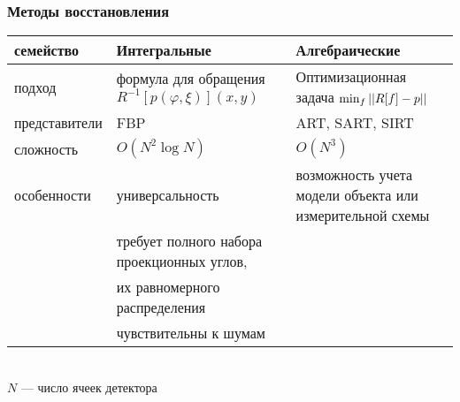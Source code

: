 \begingroup
\small
\begin{frame}
\frametitle{Методы восстановления}
\begin{tabular}{p{} | p{} | p{}}
\hspace{-1cm} семейство & Интегральные & Алгебраические \\ \hline \vspace{10pt}
\hspace{-1cm} подход & формула для обращения $R^{-1}[p(\varphi, \xi)](x,y)$ & Оптимизационная задача $\min_{f} \left|\left| R[f] - p \right|\right|$\\ \hline \vspace{10pt}
\hspace{-1cm} представители & FBP & ART, SART, SIRT \\ \hline \vspace{10pt}
\hspace{-1cm} сложность & $O(N^2 \log N)$ & $O(N^3)$ \\ \hline \vspace{10pt}
\hspace{-1cm} особенности & универсальность & возможность учета \hspace{1cm} модели объекта или измерительной схемы \\
                          & требует полного набора проекционных углов, & \\ 
                          & их равномерного распределения & \\
                          & чувствительны к шумам & \\
\end{tabular}
\\
\vspace{5pt}
$N$ --- число ячеек детектора
\end{frame}
\endgroup

